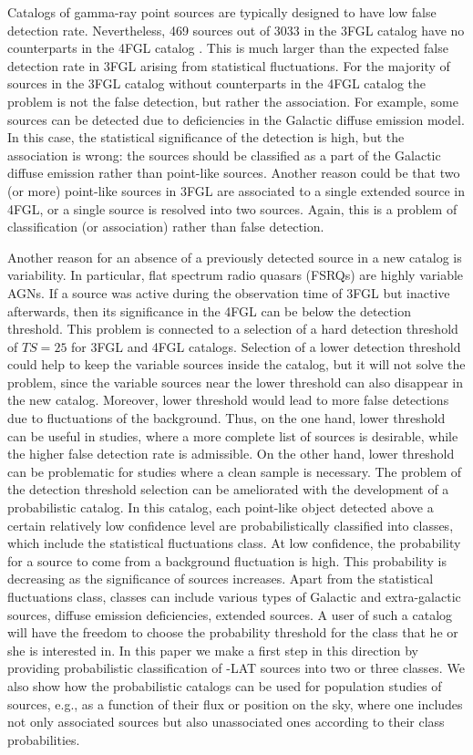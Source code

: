 Catalogs of gamma-ray point sources are typically designed to have low false detection rate. 
Nevertheless, 469 sources out of 3033 in the 3FGL catalog \citep{2015ApJS..218...23A} have no counterparts 
in the 4FGL catalog \citep{2020ApJS..247...33A}.
This is much larger than the expected false detection rate in 3FGL arising from statistical fluctuations.
For the majority of sources in the 3FGL catalog without counterparts in the 4FGL catalog the problem is not the false detection, 
but rather the association.
For example, some sources can be detected due to deficiencies in the Galactic diffuse emission model.
In this case, the statistical significance of the detection is high, but the association is wrong: the sources should be classified as
a part of the Galactic diffuse emission rather than point-like sources.
Another reason could be that two (or more) point-like sources in 3FGL are associated to a single extended source in 4FGL,
or a single source is resolved into two sources.
Again, this is a problem of classification (or association) rather than false detection.

Another reason for an absence of a previously detected source in a new catalog is variability.
In particular, flat spectrum radio quasars (FSRQs) are highly variable AGNs.
If a source was active during the observation time of 3FGL but inactive afterwards, 
then its significance in the 4FGL can be below the detection threshold.
This problem is connected to a selection of a hard detection threshold of $TS = 25$ for 3FGL and 4FGL catalogs.
Selection of a lower detection threshold could help to keep the variable sources inside the catalog, 
but it will not solve the problem, since the variable sources near the lower threshold can also disappear in the new catalog.
Moreover, lower threshold would lead to more false detections due to fluctuations of the background.
Thus, on the one hand, lower threshold can be useful in studies, where a more complete list of sources is desirable,
while the higher false detection rate is admissible. On the other hand, lower threshold can be problematic for studies where 
a clean sample is necessary. 
The problem of the detection threshold selection can be ameliorated with the development of a probabilistic catalog.
In this catalog, each point-like object detected above a certain relatively low confidence level
are probabilistically classified into classes, which include the statistical fluctuations class.
At low confidence, the probability for a source to come from a background fluctuation is high.
This probability is decreasing as the significance of sources increases.
Apart from the statistical fluctuations class, classes can include various types of Galactic and extra-galactic sources, diffuse emission deficiencies, extended sources.
A user of such a catalog will have the freedom to choose the probability threshold for the class that he or she is interested in.
In this paper we make a first step in this direction by providing probabilistic classification of \Fermi-LAT sources into two or three classes.
We also show how the probabilistic catalogs can be used for population studies of sources, e.g., as a function of their flux or position on the sky, where one includes not only associated sources but also unassociated ones according to their class probabilities.

